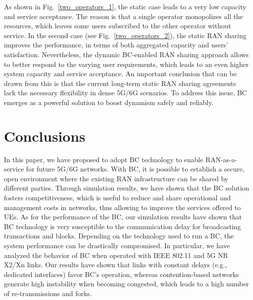 \documentclass[conference]{IEEEtran}
\theoremstyle{definition}
\begin{document}
As shown in Fig.~\ref{two_operators_1}, the static case leads to a very low capacity and service acceptance. The reason is that a single operator monopolizes all the resources, which leaves some users subscribed to the other operator without service. In the second case (see Fig.~\ref{two_operators_2}), the static RAN sharing improves the performance, in terms of both aggregated capacity and users' satisfaction. Nevertheless, the dynamic BC-enabled RAN sharing approach allows to better respond to the varying user requirements, which leads to an even higher system capacity and service acceptance. An important conclusion that can be drawn from this is that the current long-term static RAN sharing agreements lack the necessary flexibility in dense 5G/6G scenarios. To address this issue, BC emerges as a powerful solution to boost dynamism safely and reliably.

\section{Conclusions}
\label{section:conclusions}
In this paper, we have proposed to adopt BC technology to enable RAN-as-a-service for future 5G/6G networks. With BC, it is possible to establish a secure, open environment where the existing RAN infrastructure can be shared by different parties. Through simulation results, we have shown that the BC solution fosters competitiveness, which is useful to reduce and share operational and management costs in networks, thus allowing to improve the services offered to UEs. As for the performance of the BC, our simulation results have shown that BC technology is very susceptible to the communication delay for broadcasting transactions and blocks. Depending on the technology used to run a BC, the system performance can be drastically compromised. In particular, we have analyzed the behavior of BC when operated with IEEE 802.11 and 5G NR X2/Xn links. Our results have shown that links with constant delays (e.g., dedicated interfaces) favor BC's operation, whereas contention-based networks generate high instability when becoming congested, which leads to a high number of re-transmissions and forks.

\end{document}
